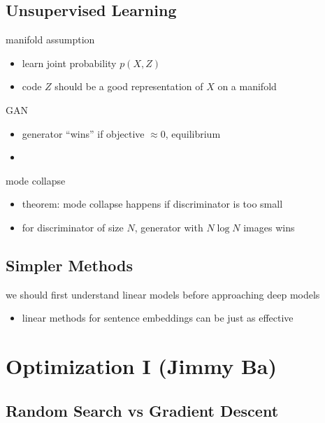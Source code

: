 \documentclass[]{article}
\theoremstyle{definition}
\begin{document}
    \subsection{Unsupervised Learning}%
    \label{sub:unsupervised_learning}

    manifold assumption
    \begin{itemize}
        \item learn joint probability $p(X,Z)$
        \item code $Z$ should be a good representation of $X$ on a manifold
    \end{itemize}

    GAN
    \begin{itemize}
        \item generator ``wins'' if objective $\approx 0$, equilibrium
        \item
    \end{itemize}

    mode collapse
    \begin{itemize}
        \item theorem: mode collapse happens if discriminator is too small
        \item for discriminator of size $N$, generator with $N \log N$ images wins
    \end{itemize}

    \subsection{Simpler Methods}%
    \label{sub:simpler_methods}

    we should first understand linear models before approaching deep models
    \begin{itemize}
        \item linear methods for sentence embeddings can be just as effective
    \end{itemize}

    \section{Optimization I {\small(Jimmy Ba)}}%
    \label{sec:optimization_i_small_jimmy_ba_}

    \subsection{Random Search vs Gradient Descent}%
    \label{sub:random_search_vs_gradient_descent}
\end{document}
